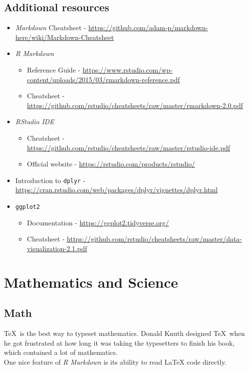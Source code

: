 \documentclass[12pt,oneside]{tisemthesis}
\providecommand{\tightlist}{%
  \setlength{\itemsep}{0pt}\setlength{\parskip}{0pt}}
\begin{document}
\hypertarget{additional-resources}{%
\section{Additional resources}\label{additional-resources}}
\begin{itemize}
\item
  \emph{Markdown} Cheatsheet - \url{https://github.com/adam-p/markdown-here/wiki/Markdown-Cheatsheet}
\item
  \emph{R Markdown}
  \begin{itemize}
  \tightlist
  \item
    Reference Guide - \url{https://www.rstudio.com/wp-content/uploads/2015/03/rmarkdown-reference.pdf}
  \item
    Cheatsheet - \url{https://github.com/rstudio/cheatsheets/raw/master/rmarkdown-2.0.pdf}
  \end{itemize}
\item
  \emph{RStudio IDE}
  \begin{itemize}
  \tightlist
  \item
    Cheatsheet - \url{https://github.com/rstudio/cheatsheets/raw/master/rstudio-ide.pdf}
  \item
    Official website - \url{https://rstudio.com/products/rstudio/}
  \end{itemize}
\item
  Introduction to \texttt{dplyr} - \url{https://cran.rstudio.com/web/packages/dplyr/vignettes/dplyr.html}
\item
  \texttt{ggplot2}
  \begin{itemize}
  \tightlist
  \item
    Documentation - \url{https://ggplot2.tidyverse.org/}
  \item
    Cheatsheet - \url{https://github.com/rstudio/cheatsheets/raw/master/data-visualization-2.1.pdf}
  \end{itemize}
\end{itemize}
\hypertarget{math-sci}{%
\chapter{Mathematics and Science}\label{math-sci}}

\hypertarget{math}{%
\section{Math}\label{math}}

\TeX~is the best way to typeset mathematics.
Donald Knuth designed \TeX~when he got frustrated at how long it was taking the typesetters to finish his book, which contained a lot of mathematics.\\
One nice feature of \emph{R Markdown} is its ability to read LaTeX code directly.
\end{document}
